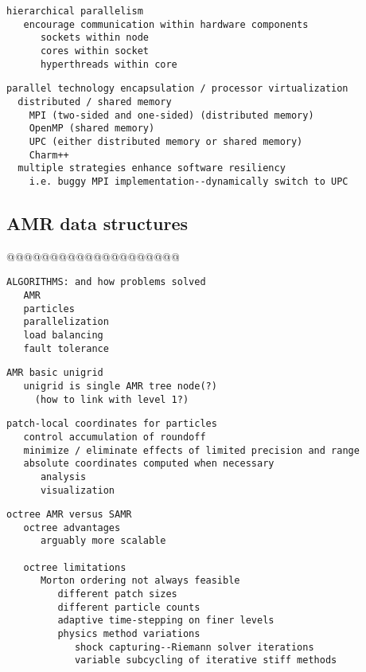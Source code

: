 \documentclass{article}
\begin{document}
\begin{verbatim}
hierarchical parallelism
   encourage communication within hardware components
      sockets within node
      cores within socket
      hyperthreads within core
\end{verbatim}

\begin{verbatim}
parallel technology encapsulation / processor virtualization
  distributed / shared memory
    MPI (two-sided and one-sided) (distributed memory)
    OpenMP (shared memory) 
    UPC (either distributed memory or shared memory)
    Charm++
  multiple strategies enhance software resiliency
    i.e. buggy MPI implementation--dynamically switch to UPC
\end{verbatim}

\subsection{AMR data structures} \label{ss:design-data}

@@@@@@@@@@@@@@@@@@@@

\begin{verbatim}
ALGORITHMS: and how problems solved
   AMR
   particles
   parallelization
   load balancing
   fault tolerance
\end{verbatim}

\begin{verbatim}
AMR basic unigrid
   unigrid is single AMR tree node(?)
     (how to link with level 1?)
\end{verbatim}

\begin{verbatim}
patch-local coordinates for particles
   control accumulation of roundoff
   minimize / eliminate effects of limited precision and range
   absolute coordinates computed when necessary
      analysis
      visualization
\end{verbatim}

\begin{verbatim}
octree AMR versus SAMR   
   octree advantages
      arguably more scalable

   octree limitations
      Morton ordering not always feasible
         different patch sizes
         different particle counts
         adaptive time-stepping on finer levels
         physics method variations
            shock capturing--Riemann solver iterations
            variable subcycling of iterative stiff methods
\end{verbatim}
\end{document}

